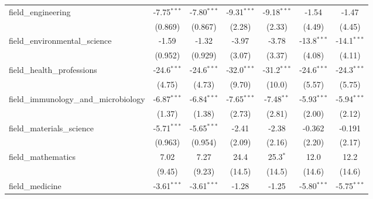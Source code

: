 \begin{tabular}{lcccccc}
   field\_engineering                                          & -7.75$^{***}$  & -7.80$^{***}$  & -9.31$^{***}$ & -9.18$^{***}$ & -1.54          & -1.47\\   
                                                               & (0.869)        & (0.867)        & (2.28)        & (2.33)        & (4.49)         & (4.45)\\   
   field\_environmental\_science                               & -1.59          & -1.32          & -3.97         & -3.78         & -13.8$^{***}$  & -14.1$^{***}$\\   
                                                               & (0.952)        & (0.929)        & (3.07)        & (3.37)        & (4.08)         & (4.11)\\   
   field\_health\_professions                                  & -24.6$^{***}$  & -24.6$^{***}$  & -32.0$^{***}$ & -31.2$^{***}$ & -24.6$^{***}$  & -24.3$^{***}$\\   
                                                               & (4.75)         & (4.73)         & (9.70)        & (10.0)        & (5.57)         & (5.75)\\   
   field\_immunology\_and\_microbiology                        & -6.87$^{***}$  & -6.84$^{***}$  & -7.65$^{***}$ & -7.48$^{**}$  & -5.93$^{***}$  & -5.94$^{***}$\\   
                                                               & (1.37)         & (1.38)         & (2.73)        & (2.81)        & (2.00)         & (2.12)\\   
   field\_materials\_science                                   & -5.71$^{***}$  & -5.65$^{***}$  & -2.41         & -2.38         & -0.362         & -0.191\\   
                                                               & (0.963)        & (0.954)        & (2.09)        & (2.16)        & (2.20)         & (2.17)\\   
   field\_mathematics                                          & 7.02           & 7.27           & 24.4          & 25.3$^{*}$    & 12.0           & 12.2\\   
                                                               & (9.45)         & (9.23)         & (14.5)        & (14.5)        & (14.6)         & (14.6)\\   
   field\_medicine                                             & -3.61$^{***}$  & -3.61$^{***}$  & -1.28         & -1.25         & -5.80$^{***}$  & -5.75$^{***}$\\   

\end{tabular}
